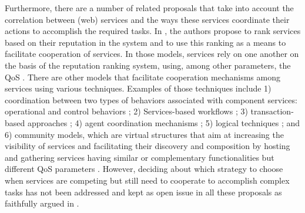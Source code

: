 Furthermore, there are a number of related proposals that take
into account the correlation between (web) services and the ways
these services coordinate their actions to accomplish the required
tasks. In \cite{Jurca,Jurca2,Malik,Maximilien1,Yahyaoui}, the
authors propose to rank services based on their reputation in the
system and to use this ranking as a means to facilitate
cooperation of services. In those models, services rely on one
another on the basis of the reputation ranking system, using,
among other parameters, the QoS \cite{Qian-Tao-2012}. There are
other models that facilitate cooperation mechanisms among services
using various techniques. Examples of those techniques include 1)
coordination between two types of behaviors associated with
component services: operational and control behaviors
\cite{Yahyaoui3}; 2) Services-based workflows \cite{Wu-2011}; 3)
transaction-based approaches \cite{Gao,Rosario}; 4) agent
coordination mechanisms \cite{Charif,Gutierrez-Garcia-2013}; 5)
logical techniques \cite{Okutan,Tang}; and 6) community models,
which are virtual structures that aim at increasing the visibility
of services and facilitating their discovery and composition by
hosting and gathering services having similar or complementary
functionalities but different QoS parameters
\cite{Khosravifar2010}. %
However, deciding about which strategy to choose when services are
competing but still need to cooperate to accomplish complex tasks
has not been addressed and kept as open issue in all these
proposals as faithfully argued in
\cite{Maamar2011,Khosravifar-ICSOC2012}.



